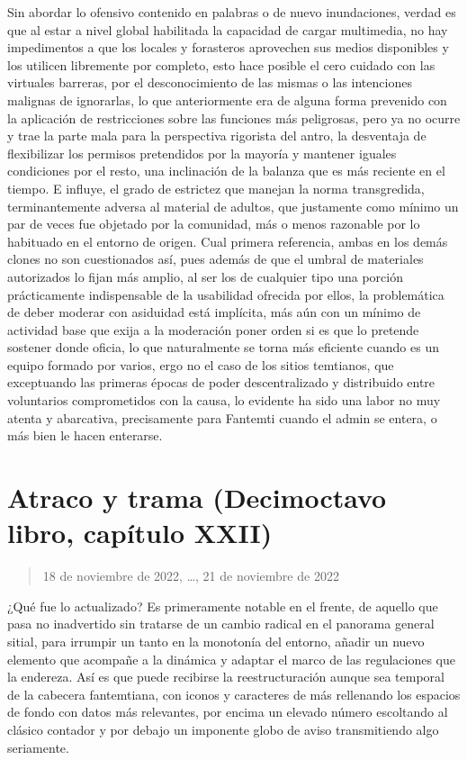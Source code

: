\documentclass[
]{book}
\begin{document}
Sin abordar lo ofensivo contenido en palabras o de nuevo inundaciones, verdad es que al estar a nivel global habilitada la capacidad de cargar multimedia, no hay impedimentos a que los locales y forasteros aprovechen sus medios disponibles y los utilicen libremente por completo, esto hace posible el cero cuidado con las virtuales barreras, por el desconocimiento de las mismas o las intenciones malignas de ignorarlas, lo que anteriormente era de alguna forma prevenido con la aplicación de restricciones sobre las funciones más peligrosas, pero ya no ocurre y trae la parte mala para la perspectiva rigorista del antro, la desventaja de flexibilizar los permisos pretendidos por la mayoría y mantener iguales condiciones por el resto, una inclinación de la balanza que es más reciente en el tiempo. E influye, el grado de estrictez que manejan la norma transgredida, terminantemente adversa al material de adultos, que justamente como mínimo un par de veces fue objetado por la comunidad, más o menos razonable por lo habituado en el entorno de origen. Cual primera referencia, ambas en los demás clones no son cuestionados así, pues además de que el umbral de materiales autorizados lo fijan más amplio, al ser los de cualquier tipo una porción prácticamente indispensable de la usabilidad ofrecida por ellos, la problemática de deber moderar con asiduidad está implícita, más aún con un mínimo de actividad base que exija a la moderación poner orden si es que lo pretende sostener donde oficia, lo que naturalmente se torna más eficiente cuando es un equipo formado por varios, ergo no el caso de los sitios temtianos, que exceptuando las primeras épocas de poder descentralizado y distribuido entre voluntarios comprometidos con la causa, lo evidente ha sido una labor no muy atenta y abarcativa, precisamente para Fantemti cuando el admin se entera, o más bien le hacen enterarse.

\hypertarget{atraco-y-trama-decimoctavo-libro-capuxedtulo-xxii}{%
\section{Atraco y trama (Decimoctavo libro, capítulo XXII)}\label{atraco-y-trama-decimoctavo-libro-capuxedtulo-xxii}}

\begin{quote}
18 de noviembre de 2022, \ldots, 21 de noviembre de 2022
\end{quote}

¿Qué fue lo actualizado? Es primeramente notable en el frente, de aquello que pasa no inadvertido sin tratarse de un cambio radical en el panorama general sitial, para irrumpir un tanto en la monotonía del entorno, añadir un nuevo elemento que acompañe a la dinámica y adaptar el marco de las regulaciones que la endereza. Así es que puede recibirse la reestructuración aunque sea temporal de la cabecera fantemtiana, con iconos y caracteres de más rellenando los espacios de fondo con datos más relevantes, por encima un elevado número escoltando al clásico contador y por debajo un imponente globo de aviso transmitiendo algo seriamente.
\end{document}
